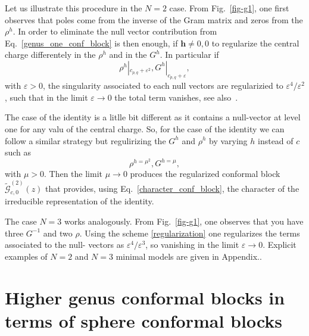 \documentclass[a4paper,11pt]{article}
\begin{document}
\noindent Let us illustrate this procedure in the $N=2$ case.  From Fig.~\ref{fig-g1}, one first observes that poles come from the inverse of the Gram matrix and zeros from the $\rho^h$. In order to eliminate the null vector contribution from Eq.~\eqref{genus_one_conf_block} is then
enough, if $\boldsymbol{h}\neq {0,0}$ to regularize  the central charge differentely in the  
$\rho^h$ and in the $G^h$. In particular if  
\begin{equation}\label{regularization}
 \rho^h|_{c_{p,q}+\varepsilon^2}, G^h|_{c_{p,q}+\varepsilon},
\end{equation}
with $\varepsilon>0$, the singularity associated to each null vectors are regularizied to $\varepsilon^4/\varepsilon^2$, such that in the limit $\varepsilon\to 0$ the total term vanishes, see also~\cite{SV, Alkalaev}.

The case of the identity is a litlle bit different as it contains a null-vector at level one for any valu of the central charge. So, 
for the case of the identity  we can follow a similar strategy but regulirizing  the $G^h$ and 
$\rho^h$ by varying  $h$ instead of $c$ such as
\begin{equation}\label{regularization_identity}
 \rho^{h=\mu^2}, G^{h=\mu},
\end{equation}
with $\mu>0$. Then the limit $\mu\to 0$ produces the regularized 
conformal block $\tilde{\mathcal{G}}_{c, 0}^{(2)}(z)$ that
provides, using Eq.~\eqref{character_conf_block}, the  character of the irreducible representation of the identity.

The case $N=3$ works analogously. From Fig.~\ref{fig-g1}, one observes that you have three $G^{-1}$ and two $\rho$. Using the scheme \eqref{regularization} one regularizes the terms associated to the null- vectors as $\varepsilon^4/\varepsilon^3$, so vanishing in the limit $\varepsilon \to 0$. Explicit examples of $N=2$ and $N=3$ minimal models are given in Appendix.. 


\section{Higher genus conformal blocks in terms of sphere conformal blocks}\label{app_sphere_conf_blocks}
\end{document}
